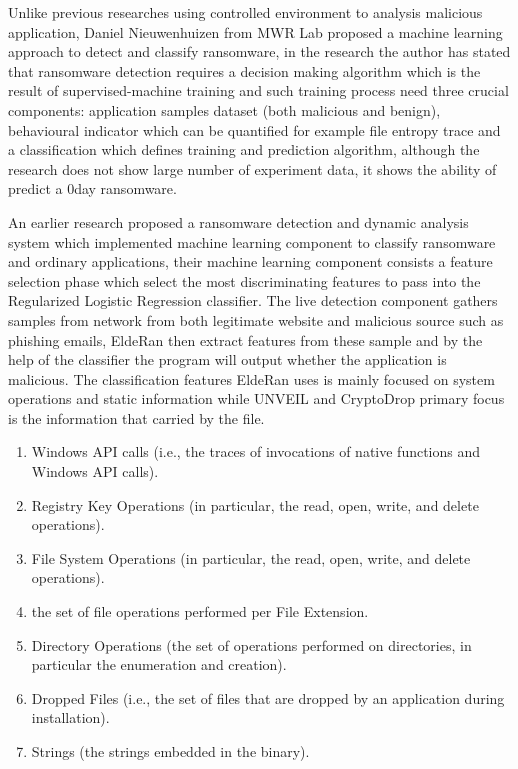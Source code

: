 \documentclass[]{PLR-ShaofengLiu}
\begin{document}
Unlike previous researches using controlled environment to analysis 
malicious application, Daniel Nieuwenhuizen\cite{MWR} from MWR Lab proposed a 
machine learning approach to detect and classify ransomware, in the 
research the author has stated that ransomware detection requires a 
decision making algorithm which is the result of supervised-machine 
training and such training process need three crucial components: 
application samples dataset (both malicious and benign), behavioural 
indicator which can be quantified for example file entropy trace and 
a classification which defines training and prediction algorithm, 
although the research does not show large number of experiment data, 
it shows the ability of predict a 0day ransomware.

An earlier research\cite{RHUL:2015, Lorenzo:RHUL, DDH:2015} proposed a ransomware detection and dynamic analysis 
system which implemented machine learning component to classify ransomware 
and ordinary applications, their machine learning component	consists a 
feature selection phase which select the most discriminating features to 
pass into the Regularized Logistic Regression classifier. The live 
detection component gathers samples from network from both legitimate 
website and malicious source such as phishing emails, EldeRan then extract 
features from these sample and by the help of the classifier the program 
will output whether the application is malicious.
The classification features EldeRan uses is mainly focused on system operations and static information while UNVEIL and CryptoDrop primary focus is the information that carried by the file.
  \begin{enumerate}
    \item Windows API calls (i.e., the traces of invocations of native
      functions and Windows API calls).
    \item Registry Key Operations (in particular, the read, open, write, and delete
operations).
    \item File System Operations (in particular, the read, open, write, and delete operations).
    \item the set of file operations performed per File Extension. 
    \item Directory Operations (the set of operations performed on directories,
in particular the enumeration and creation).
    \item Dropped Files (i.e., the set of files that are dropped by an application
during installation).
    \item Strings (the strings embedded in the binary). 
  \end{enumerate}
\end{document}
